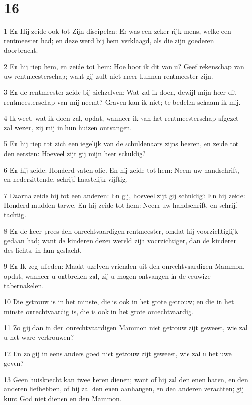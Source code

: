 \chapter{16}

\par 1 En Hij zeide ook tot Zijn discipelen: Er was een zeker rijk mens, welke een rentmeester had; en deze werd bij hem verklaagd, als die zijn goederen doorbracht.
\par 2 En hij riep hem, en zeide tot hem: Hoe hoor ik dit van u? Geef rekenschap van uw rentmeesterschap; want gij zult niet meer kunnen rentmeester zijn.
\par 3 En de rentmeester zeide bij zichzelven: Wat zal ik doen, dewijl mijn heer dit rentmeesterschap van mij neemt? Graven kan ik niet; te bedelen schaam ik mij.
\par 4 Ik weet, wat ik doen zal, opdat, wanneer ik van het rentmeesterschap afgezet zal wezen, zij mij in hun huizen ontvangen.
\par 5 En hij riep tot zich een iegelijk van de schuldenaars zijns heeren, en zeide tot den eersten: Hoeveel zijt gij mijn heer schuldig?
\par 6 En hij zeide: Honderd vaten olie. En hij zeide tot hem: Neem uw handschrift, en nederzittende, schrijf haastelijk vijftig.
\par 7 Daarna zeide hij tot een anderen: En gij, hoeveel zijt gij schuldig? En hij zeide: Honderd mudden tarwe. En hij zeide tot hem: Neem uw handschrift, en schrijf tachtig.
\par 8 En de heer prees den onrechtvaardigen rentmeester, omdat hij voorzichtiglijk gedaan had; want de kinderen dezer wereld zijn voorzichtiger, dan de kinderen des lichts, in hun geslacht.
\par 9 En Ik zeg ulieden: Maakt uzelven vrienden uit den onrechtvaardigen Mammon, opdat, wanneer u ontbreken zal, zij u mogen ontvangen in de eeuwige tabernakelen.
\par 10 Die getrouw is in het minste, die is ook in het grote getrouw; en die in het minste onrechtvaardig is, die is ook in het grote onrechtvaardig.
\par 11 Zo gij dan in den onrechtvaardigen Mammon niet getrouw zijt geweest, wie zal u het ware vertrouwen?
\par 12 En zo gij in eens anders goed niet getrouw zijt geweest, wie zal u het uwe geven?
\par 13 Geen huisknecht kan twee heren dienen; want of hij zal den enen haten, en den anderen liefhebben, of hij zal den enen aanhangen, en den anderen verachten; gij kunt God niet dienen en den Mammon.
